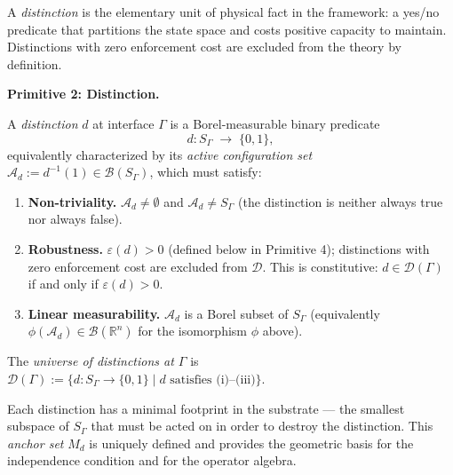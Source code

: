 \documentclass[11pt]{article}
\theoremstyle{remark}
\begin{document}
A \emph{distinction} is the elementary unit of physical fact in the framework: a yes/no predicate that partitions the state space and costs positive capacity to maintain.  Distinctions with zero enforcement cost are excluded from the theory by definition.

\begin{tcolorbox}[defbox, title={$\mathrm{FD2}$ (Distinction): Binary Predicate and Robustness}]
\noindent\textbf{Primitive 2: Distinction.}

A \emph{distinction} $d$ at interface $\Gamma$ is a Borel-measurable binary predicate
\[
d: S_\Gamma \;\longrightarrow\; \{0, 1\},
\]
equivalently characterized by its \emph{active configuration set} $\mathcal{A}_d := d^{-1}(1) \in \mathcal{B}(S_\Gamma)$, which must satisfy:
\begin{enumerate}[nosep,leftmargin=2em,itemsep=2pt,label=(\roman*)]
  \item \textbf{Non-triviality.}  $\mathcal{A}_d \ne \emptyset$ and $\mathcal{A}_d \ne S_\Gamma$ (the distinction is neither always true nor always false).
  \item \textbf{Robustness.}  $\varepsilon(d) > 0$ (defined below in Primitive 4); distinctions with zero enforcement cost are excluded from $\mathcal{D}$.  This is constitutive: $d \in \mathcal{D}(\Gamma)$ if and only if $\varepsilon(d) > 0$.
  \item \textbf{Linear measurability.}  $\mathcal{A}_d$ is a Borel subset of $S_\Gamma$ (equivalently $\phi(\mathcal{A}_d) \in \mathcal{B}(\mathbb{R}^n)$ for the isomorphism $\phi$ above).
\end{enumerate}
The \emph{universe of distinctions at $\Gamma$} is $\mathcal{D}(\Gamma) := \{d: S_\Gamma \to \{0,1\} \mid d \text{ satisfies (i)--(iii)}\}$.

\medskip

\end{tcolorbox}

Each distinction has a minimal footprint in the substrate --- the smallest subspace of $S_\Gamma$ that must be acted on in order to destroy the distinction.  This \emph{anchor set} $M_d$ is uniquely defined and provides the geometric basis for the independence condition and for the operator algebra.
\end{document}
